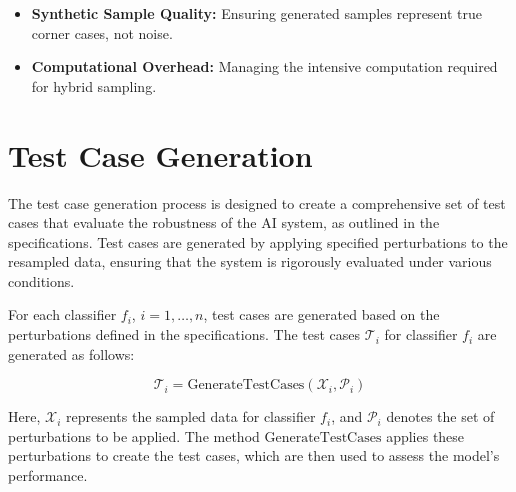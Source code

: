 \begin{tcolorbox}[colback=purple!2!white, colframe=purple, title=Challenges in Sampling]
  \begin{itemize}
    \item \textbf{Synthetic Sample Quality:} Ensuring generated samples represent true corner cases, not noise.
    \item \textbf{Computational Overhead:} Managing the intensive computation required for hybrid sampling.
 
  \end{itemize}

\end{tcolorbox}


\section{Test Case Generation}

The test case generation process is designed to create a comprehensive set of test cases that evaluate the robustness of the AI system, as outlined in the specifications. Test cases are generated by applying specified perturbations to the resampled data, ensuring that the system is rigorously evaluated under various conditions.

For each classifier $f_i$, $i = 1, \dots, n$, test cases are generated based on the perturbations defined in the specifications. The test cases $\mathcal{T}_i$ for classifier $f_i$ are generated as follows:

\begin{equation}
\mathcal{T}_i = \text{GenerateTestCases}(\mathcal{X}_i, \mathcal{P}_i)
\end{equation}

Here, $\mathcal{X}_i$ represents the sampled data for classifier $f_i$, and $\mathcal{P}_i$ denotes the set of perturbations to be applied. The method $\text{GenerateTestCases}$ applies these perturbations to create the test cases, which are then used to assess the model's performance.

